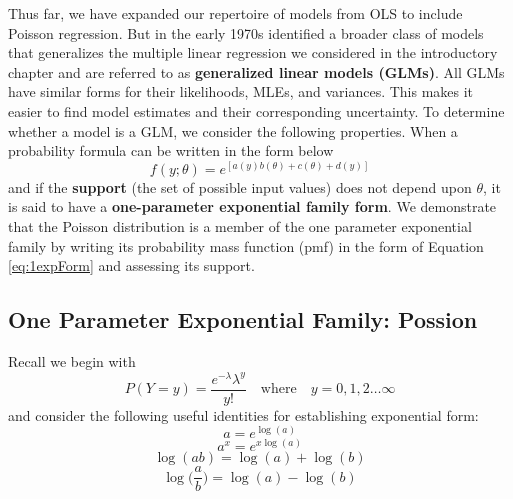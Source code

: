 \documentclass[
]{krantz}
\begin{document}
Thus far, we have expanded our repertoire of models from OLS to include Poisson regression. But in the early 1970s \citet{Nelder1972} identified a broader class of models that generalizes the multiple linear regression we considered in the introductory chapter and are referred to as \textbf{generalized linear models (GLMs)}. All GLMs have similar forms for their likelihoods, MLEs, and variances. This makes it easier to find model estimates and their corresponding uncertainty. To determine whether a model is a GLM, we consider the following properties.
When a probability formula can be written in the form below
\begin{equation}
f(y;\theta)=e^{[a(y)b(\theta)+c(\theta)+d(y)]}
\label{eq:1expForm}
\end{equation}
and if the \textbf{support} (the set of possible input values) does not depend upon \(\theta\), it is said to have a \textbf{one-parameter exponential family form}. We demonstrate that the Poisson distribution is a member of the one parameter exponential family by writing its probability mass function (pmf) in the form of Equation \eqref{eq:1expForm} and assessing its support.

\hypertarget{one-parameter-exponential-family-possion}{%
\subsection{One Parameter Exponential Family: Possion}\label{one-parameter-exponential-family-possion}}

Recall we begin with
\[
P(Y=y)=\frac{e^{-\lambda}{\lambda}^y}{y!}\quad \textrm{where}\quad y=0,1,2\ldots\infty
\]
and consider the following useful identities for establishing exponential form:
\[a=e^{\log(a)} \]
\[a^x = e^{x\log(a)}\]
\[\log(ab)=\log(a)+\log(b)\]
\[\log\Big(\frac{a}{b}\Big)=\log(a)-\log(b)\]
\end{document}

